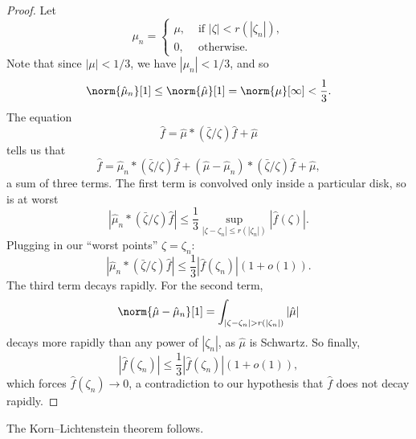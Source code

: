 \begin{proof}
Let
\[
\mu_n = 
\begin{cases}
\mu, & \text{ if \(|\zeta|<r(|\zeta_n|)\)}, \\
0, & \text{ otherwise}.
\end{cases}
\]
Note that since \(|\mu|<1/3\), we have \(|\mu_n|<1/3\), and so
\[
\norm{\hat\mu_n}[1]\le\norm{\hat\mu}[1]=\norm{\mu}[\infty]<\frac{1}{3}.
\]
The equation
\[
\hat{f} = \hat{\mu} * (\bar\zeta/\zeta) \hat{f} + \hat\mu
\]
tells us that
\[
\hat{f} = \hat{\mu}_n * (\bar\zeta/\zeta) \hat{f} + (\hat\mu-\hat{\mu}_n) * (\bar\zeta/\zeta) \hat{f} + \hat\mu,
\]
a sum of three terms.
The first term is convolved only inside a particular disk, so is at worst
\[
\left|
\hat{\mu}_n * (\bar\zeta/\zeta) \hat{f}
\right|
\le \frac{1}{3} \sup_{|\zeta-\zeta_n|\le r(|\zeta_n|)}|\hat{f}(\zeta)|.
\]
Plugging in our ``worst points'' \(\zeta=\zeta_n\):
\[
\left|
\hat{\mu}_n * (\bar\zeta/\zeta) \hat{f}
\right|
\le \frac{1}{3} |\hat{f}(\zeta_n)|(1+o(1)).
\]
The third term decays rapidly.
For the second term, 
\[
\norm{\hat\mu-\hat{\mu}_n}[1]
=\int_{|\zeta-\zeta_n|>r(|\zeta_n|)} |\hat\mu|
\] 
decays more rapidly than any power of \(|\zeta_n|\), as \(\hat\mu\) is Schwartz.
So finally,
\[
|\hat{f}(\zeta_n)| \le \frac{1}{3} |\hat{f}(\zeta_n)| (1+o(1)),
\]
which forces \(\hat{f}(\zeta_n) \to 0\), a contradiction to our hypothesis that \(\hat{f}\) does not decay rapidly.
\end{proof}
The Korn--Lichtenstein theorem follows.


